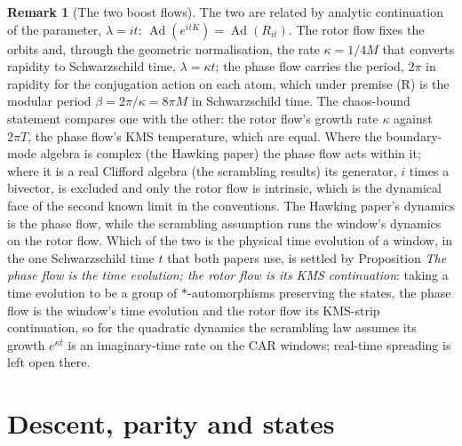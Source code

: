 \documentclass[11pt]{article}
\theoremstyle{definition}
\newtheorem{remark}[theorem]{Remark}
\theoremstyle{plain}
\begin{document}
\begin{remark}[The two boost flows]
The two are related by analytic continuation of the parameter, $\lambda = it$: $\operatorname{Ad}(e^{itK}) = \operatorname{Ad}(R_{it})$. The rotor flow fixes the orbits and, through the geometric normalisation, the rate $\kappa = 1/4M$ that converts rapidity to Schwarzschild time, $\lambda = \kappa t$; the phase flow carries the period, $2\pi$ in rapidity for the conjugation action on each atom, which under premise (R) is the modular period $\beta = 2\pi/\kappa = 8\pi M$ in Schwarzschild time. The chaos-bound statement compares one with the other: the rotor flow's growth rate $\kappa$ against $2\pi T$, the phase flow's KMS temperature, which are equal. Where the boundary-mode algebra is complex (the Hawking paper) the phase flow acts within it; where it is a real Clifford algebra (the scrambling results) its generator, $i$ times a bivector, is excluded and only the rotor flow is intrinsic, which is the dynamical face of the second known limit in the conventions. The Hawking paper's dynamics is the phase flow, while the scrambling assumption runs the window's dynamics on the rotor flow. Which of the two is the physical time evolution of a window, in the one Schwarzschild time $t$ that both papers use, is settled by Proposition \emph{The phase flow is the time evolution; the rotor flow is its KMS continuation}: taking a time evolution to be a group of $*$-automorphisms preserving the states, the phase flow is the window's time evolution and the rotor flow its KMS-strip continuation, so for the quadratic dynamics the scrambling law assumes its growth $e^{\kappa t}$ is an imaginary-time rate on the CAR windows; real-time spreading is left open there.
\end{remark}

\section{Descent, parity and states}
\end{document}
